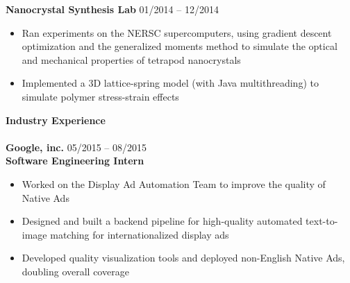 \documentclass{article}
\begin{document}
\noindent
\textbf{Nanocrystal Synthesis Lab}
\hfill 01/2014 -- 12/2014
\begin{itemize}
\vspace{-1.8mm}
\item Ran experiments on the NERSC supercomputers, using gradient descent optimization and the generalized moments method to simulate the optical and mechanical properties of tetrapod nanocrystals
\vspace{-2.5mm}
\item Implemented a 3D lattice-spring model (with Java multithreading) to simulate polymer stress-strain effects
\end{itemize}

\noindent
\textbf{{\Large Industry Experience}}\\[-2mm]
\HRule\\
\textbf{Google, inc.}
\hfill 05/2015 -- 08/2015\\
\textbf{Software Engineering Intern}
\begin{itemize}
\vspace{-1.8mm}
\item Worked on the Display Ad Automation Team to improve the quality of Native Ads
\vspace{-2.5mm}
\item Designed and built a backend pipeline for high-quality automated text-to-image matching for internationalized display ads
\vspace{-2.5mm}
\item Developed quality visualization tools and deployed non-English Native Ads, doubling overall coverage
\end{itemize}
\vspace{1mm}
\end{document}
